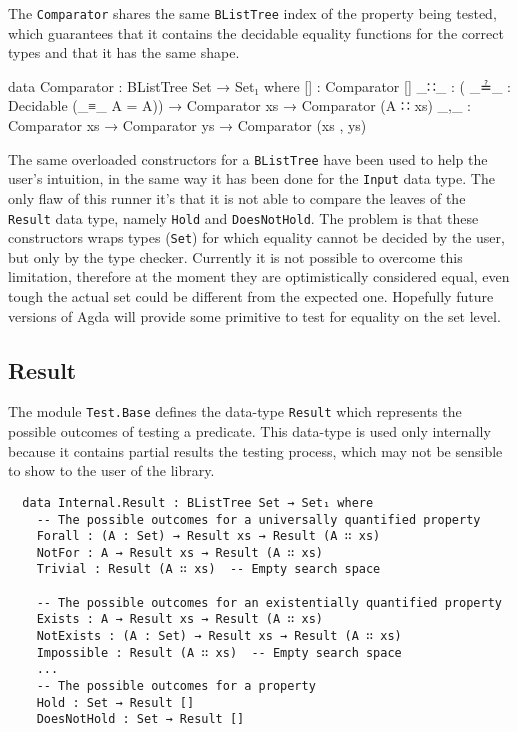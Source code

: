 \documentclass[10pt,a4paper]{article}
\begin{document}
The \texttt{Comparator} shares the same \texttt{BListTree} index  of the property  being tested, which guarantees that it contains the decidable equality functions for the correct types and that it has the same shape.
\begin{code}
data Comparator : BListTree Set → Set₁ where
  [] : Comparator []
  _∷_ : ( _≟_ : Decidable (_≡_ {A = A}))  → Comparator xs → Comparator (A ∷ xs)
  _,_ : Comparator xs → Comparator ys → Comparator (xs , ys)
\end{code}
The same overloaded constructors for a \texttt{BListTree} have been used to help the user's intuition, in the same way it has been done for the \texttt{Input} data type.
The only flaw of this runner it's that it is not able to compare the leaves of the \texttt{Result} data type, namely \texttt{Hold} and \texttt{DoesNotHold}. The problem is that these constructors wraps types (\texttt{Set}) for which equality cannot be decided by the user, but only by the type checker. Currently it is not possible to overcome this limitation, therefore at the moment they are optimistically considered equal, even tough the actual set could be different from the expected one. Hopefully future versions of Agda will provide some primitive to test for equality on the set level.

\subsection{Result}
\label{sec:Result}
The module \texttt{Test.Base} defines the data-type \texttt{Result} which represents the possible outcomes of testing a predicate. This data-type is used only internally because it contains partial results the testing process, which may not be sensible to show to the user of the library.

\begin{verbatim}
  data Internal.Result : BListTree Set → Set₁ where
    -- The possible outcomes for a universally quantified property
    Forall : (A : Set) → Result xs → Result (A ∷ xs)
    NotFor : A → Result xs → Result (A ∷ xs)
    Trivial : Result (A ∷ xs)  -- Empty search space

    -- The possible outcomes for an existentially quantified property
    Exists : A → Result xs → Result (A ∷ xs)
    NotExists : (A : Set) → Result xs → Result (A ∷ xs)
    Impossible : Result (A ∷ xs)  -- Empty search space
    ...	
    -- The possible outcomes for a property
    Hold : Set → Result []
    DoesNotHold : Set → Result []
\end{verbatim}
\end{document}
